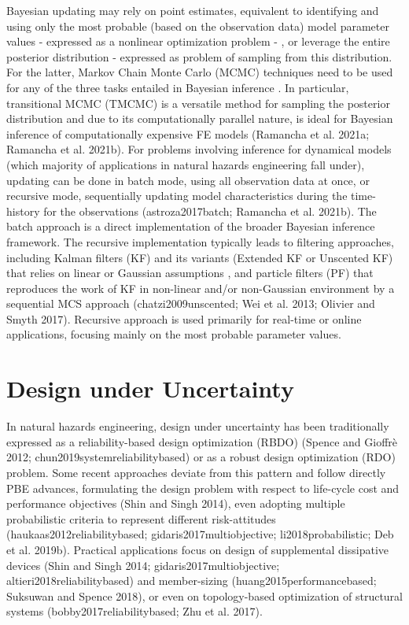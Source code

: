 Bayesian updating may rely on point estimates, equivalent to identifying and using only the most probable (based on the observation data) model parameter values - expressed as a nonlinear optimization problem - , or leverage the entire posterior distribution - expressed as problem of sampling from this distribution. For the latter, Markov Chain Monte Carlo (MCMC) techniques need to be used for any of the three tasks entailed in Bayesian inference \citep{catanach2018bayesian}. In particular, transitional MCMC (TMCMC) is a versatile method for sampling the posterior distribution \citep{ching2007transitional,betz2016transitional} and due to its computationally parallel nature, is ideal for Bayesian inference of computationally expensive FE models (Ramancha et al. 2021a; Ramancha et al. 2021b). For problems involving inference for dynamical models (which majority of applications in natural hazards engineering fall under), updating can be done in batch mode, using all observation data at once, or recursive mode, sequentially updating model characteristics during the time-history for the observations (astroza2017batch; Ramancha et al. 2021b). The batch approach is a direct implementation of the broader Bayesian inference framework. The recursive implementation typically leads to filtering approaches, including Kalman filters (KF) and its variants (Extended KF or Unscented KF) that relies on linear or Gaussian assumptions \citep{astroza2017batch,kontoroupi2017online,erazo2018bayesian}, and particle filters (PF) that reproduces the work of KF in non-linear and/or non-Gaussian environment by a sequential MCS approach (chatzi2009unscented; Wei et al. 2013; Olivier and Smyth 2017). Recursive approach is used primarily for real-time or online applications, focusing mainly on the most probable parameter values. 

\section{Design under Uncertainty}
\label{sec:uq_design}

In natural hazards engineering, design under uncertainty has been traditionally expressed as a reliability-based design optimization (RBDO) (Spence and Gioffrè 2012; chun2019systemreliabilitybased) or as a robust design optimization (RDO) \citep{greco2015robust} problem. Some recent approaches deviate from this pattern and follow directly PBE advances, formulating the design problem with respect to life-cycle cost and performance objectives (Shin and Singh 2014), even adopting multiple probabilistic criteria to represent different risk-attitudes (haukaas2012reliabilitybased; gidaris2017multiobjective; li2018probabilistic; Deb et al. 2019b). Practical applications focus on design of supplemental dissipative devices (Shin and Singh 2014; gidaris2017multiobjective; altieri2018reliabilitybased) and member-sizing (huang2015performancebased; Suksuwan and Spence 2018), or even on topology-based optimization of structural systems (bobby2017reliabilitybased; Zhu et al. 2017).

